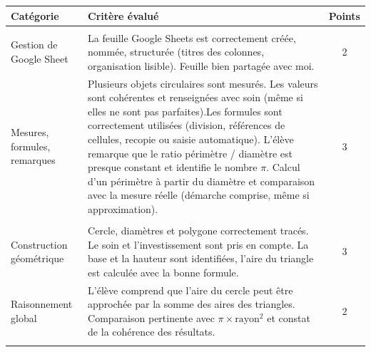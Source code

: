 \documentclass{exam}
\begin{document}
\renewcommand{\arraystretch}{1.6}
{
\centering
\begin{longtable}{|L{0.22\textwidth}|L{0.62\textwidth}|c|}
\hline
{}
\textbf{Catégorie} & \textbf{Critère évalué} & \textbf{Points} \\[2pt]
\hline

 \\
\hline

Gestion de Google Sheet 
& La feuille Google Sheets est correctement créée, nommée, structurée (titres des colonnes, organisation lisible).
Feuille bien partagée avec moi.
& 2 \\
\hline

Mesures, formules, remarques
& Plusieurs objets circulaires sont mesurés. Les valeurs sont cohérentes et renseignées avec soin (même si elles ne sont pas parfaites).Les formules sont correctement utilisées (division, références de cellules, recopie ou saisie automatique).
L'élève remarque que le ratio périmètre / diamètre est presque constant et identifie le nombre $\pi$.
Calcul d’un périmètre à partir du diamètre et comparaison avec la mesure réelle (démarche comprise, même si approximation).
& 3 \\
\hline

 \\
\hline

Construction géométrique
& Cercle, diamètres et polygone correctement tracés. Le soin et l’investissement sont pris en compte. La base et la hauteur sont identifiées, l’aire du triangle est calculée avec la bonne formule.
& 3 \\
\hline

Raisonnement global
& L’élève comprend que l’aire du cercle peut être approchée par la somme des aires des triangles. Comparaison pertinente avec $\pi \times \text{rayon}^2$ et constat de la cohérence des résultats.
& 2 \\
\hline


 \\
\hline


\end{longtable}}
\end{document}
